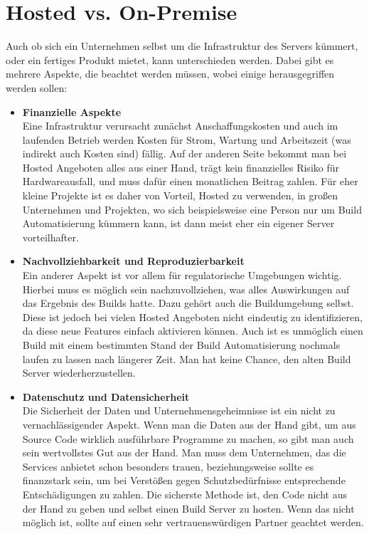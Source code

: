\section{Hosted vs. On-Premise}
Auch ob sich ein Unternehmen selbst um die Infrastruktur des Servers kümmert, oder ein fertiges Produkt mietet, kann unterschieden werden. Dabei gibt es mehrere Aspekte, die beachtet werden müssen, wobei einige herausgegriffen werden sollen:
\begin{itemize}
	\item \textbf{Finanzielle Aspekte}\\
	Eine Infrastruktur verursacht zunächst Anschaffungskosten und auch im laufenden Betrieb werden Kosten für Strom, Wartung und Arbeitszeit (was indirekt auch Kosten sind) fällig. Auf der anderen Seite bekommt man bei Hosted Angeboten alles aus einer Hand, trägt kein finanzielles Risiko für Hardwareausfall, und muss dafür einen monatlichen Beitrag zahlen. Für eher kleine Projekte ist es daher von Vorteil, Hosted zu verwenden, in großen Unternehmen und Projekten, wo sich beispielsweise eine Person nur um Build Automatisierung kümmern kann, ist dann meist eher ein eigener Server vorteilhafter.
	\item \textbf{Nachvollziehbarkeit und Reproduzierbarkeit}\\
	Ein anderer Aspekt ist vor allem für regulatorische Umgebungen wichtig. Hierbei muss es möglich sein nachzuvollziehen, was alles Auswirkungen auf das Ergebnis des Builds hatte. Dazu gehört auch die Buildumgebung selbst. Diese ist jedoch bei vielen Hosted Angeboten nicht eindeutig zu identifizieren, da diese neue Features einfach aktivieren können. Auch ist es unmöglich einen Build mit einem bestimmten Stand der Build Automatisierung nochmals laufen zu lassen nach längerer Zeit. Man hat keine Chance, den alten Build Server wiederherzustellen.
	\item \textbf{Datenschutz und Datensicherheit}\\
	Die Sicherheit der Daten und Unternehmensgeheimnisse ist ein nicht zu vernachlässigender Aspekt. Wenn man die Daten aus der Hand gibt, um aus Source Code wirklich ausführbare Programme zu machen, so gibt man auch sein wertvollstes Gut aus der Hand. Man muss dem Unternehmen, das die Services anbietet schon besonders trauen, beziehungsweise sollte es finanzstark sein, um bei Verstößen gegen Schutzbedürfnisse entsprechende Entschädigungen zu zahlen. Die sicherste Methode ist, den Code nicht aus der Hand zu geben und selbst einen Build Server zu hosten. Wenn das nicht möglich ist, sollte auf einen sehr vertrauenswürdigen Partner geachtet werden.
\end{itemize}
